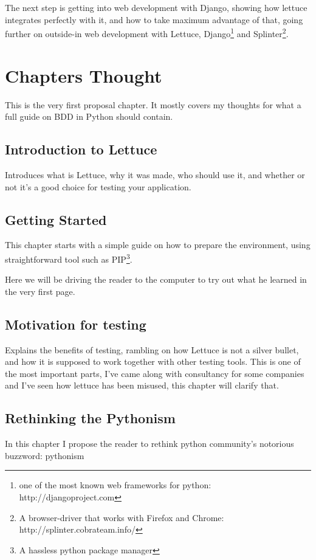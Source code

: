 \documentclass[letterpaper]{article}
\begin{document}
\noindent
The next step is getting into web development with Django, showing how
lettuce integrates perfectly with it, and how to take maximum
advantage of that, going further on outside-in web development with
Lettuce, Django\footnote{one of the most known web frameworks for python: http://djangoproject.com} and Splinter\footnote{A browser-driver that works with Firefox and Chrome: http://splinter.cobrateam.info/}.

\section*{Chapters Thought}
This is the very first proposal chapter. It mostly covers my
thoughts for what a full guide on BDD in Python should contain.

\subsection*{Introduction to Lettuce}
\noindent
Introduces what is Lettuce, why it was made, who should use it, and
whether or not it's a good choice for testing your application.

\subsection*{Getting Started}
\noindent
This chapter starts with a simple guide on how to prepare the environment, using straightforward tool such as PIP\footnote{A hassless python package manager}.

Here we will be driving the reader to the computer to try out what he
learned in the very first page.

\subsection*{Motivation for testing}
\noindent
Explains the benefits of testing, rambling on how Lettuce is not a
silver bullet, and how it is supposed to work together with other
testing tools.
\noindent
This is one of the most important parts, I've came along with
consultancy for some companies and I've seen how lettuce has been
misused, this chapter will clarify that.

\subsection*{Rethinking the Pythonism}
\noindent
In this chapter I propose the reader to rethink python community's
notorious buzzword: pythonism
\end{document}
